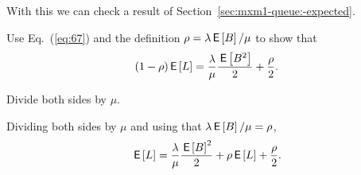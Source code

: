 With this we can check a result of Section~\ref{sec:mxm1-queue:-expected}.  
\begin{exercise}{\faCalculator}
  Use Eq.~(\ref{eq:67}) and the definition  $\rho=\lambda \,\mathsf{E}\left[B\right]/\mu$ to show that
\begin{equation*}
(1- \rho) \,\mathsf{E}\left[L\right] = \frac{\lambda}\mu \frac{\,\mathsf{E}\left[B^2\right]}2 + \frac\rho2.
\end{equation*}
\begin{hint}
Divide both sides by $\mu$.
\end{hint}
\begin{solution}
Dividing both sides by $\mu$ and using that $\lambda \,\mathsf{E}\left[B\right]/\mu = \rho$, 
\begin{equation*}
  \,\mathsf{E}\left[L\right] = \frac{\lambda}{\mu}  \frac{\,\mathsf{E}\left[B\right]^2 }2 + \rho \,\mathsf{E}\left[L\right] + \frac\rho2.
\end{equation*}
\end{solution}
\end{exercise}



